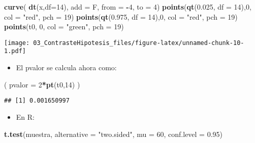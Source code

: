\documentclass[]{article}
\newenvironment{Shaded}{\begin{snugshade}}{\end{snugshade}}
\newcommand{\KeywordTok}[1]{\textcolor[rgb]{0.13,0.29,0.53}{\textbf{#1}}}
\newcommand{\DataTypeTok}[1]{\textcolor[rgb]{0.13,0.29,0.53}{#1}}
\newcommand{\DecValTok}[1]{\textcolor[rgb]{0.00,0.00,0.81}{#1}}
\newcommand{\FloatTok}[1]{\textcolor[rgb]{0.00,0.00,0.81}{#1}}
\newcommand{\StringTok}[1]{\textcolor[rgb]{0.31,0.60,0.02}{#1}}
\newcommand{\OperatorTok}[1]{\textcolor[rgb]{0.81,0.36,0.00}{\textbf{#1}}}
\newcommand{\NormalTok}[1]{#1}
\providecommand{\tightlist}{%
  \setlength{\itemsep}{0pt}\setlength{\parskip}{0pt}}
\begin{document}
\begin{Shaded}
\begin{Highlighting}[]
\KeywordTok{curve}\NormalTok{( }\KeywordTok{dt}\NormalTok{(x,}\DataTypeTok{df=}\DecValTok{14}\NormalTok{), }\DataTypeTok{add =}\NormalTok{ F, }\DataTypeTok{from =} \OperatorTok{-}\DecValTok{4}\NormalTok{, }\DataTypeTok{to =} \DecValTok{4}\NormalTok{)}
\KeywordTok{points}\NormalTok{(}\KeywordTok{qt}\NormalTok{(}\FloatTok{0.025}\NormalTok{, }\DataTypeTok{df =} \DecValTok{14}\NormalTok{),}\DecValTok{0}\NormalTok{, }\DataTypeTok{col =} \StringTok{"red"}\NormalTok{, }\DataTypeTok{pch =} \DecValTok{19}\NormalTok{)}
\KeywordTok{points}\NormalTok{(}\KeywordTok{qt}\NormalTok{(}\FloatTok{0.975}\NormalTok{, }\DataTypeTok{df =} \DecValTok{14}\NormalTok{),}\DecValTok{0}\NormalTok{, }\DataTypeTok{col =} \StringTok{"red"}\NormalTok{, }\DataTypeTok{pch =} \DecValTok{19}\NormalTok{)}
\KeywordTok{points}\NormalTok{(t0, }\DecValTok{0}\NormalTok{, }\DataTypeTok{col =} \StringTok{"green"}\NormalTok{, }\DataTypeTok{pch =} \DecValTok{19}\NormalTok{)}
\end{Highlighting}
\end{Shaded}

\texttt{[image: 03\_ContrasteHipotesis\_files/figure-latex/unnamed-chunk-10-1.pdf]}

\begin{itemize}
\tightlist
\item
  El pvalor se calcula ahora como:
\end{itemize}

\begin{Shaded}
\begin{Highlighting}[]
\NormalTok{( }\DataTypeTok{pvalor =} \DecValTok{2}\OperatorTok{*}\KeywordTok{pt}\NormalTok{(t0,}\DecValTok{14}\NormalTok{) )}
\end{Highlighting}
\end{Shaded}

\begin{verbatim}
## [1] 0.001650997
\end{verbatim}

\begin{itemize}
\tightlist
\item
  En R:
\end{itemize}

\begin{Shaded}
\begin{Highlighting}[]
\KeywordTok{t.test}\NormalTok{(muestra, }\DataTypeTok{alternative =} \StringTok{"two.sided"}\NormalTok{, }\DataTypeTok{mu =} \DecValTok{60}\NormalTok{, }\DataTypeTok{conf.level =} \FloatTok{0.95}\NormalTok{)}
\end{Highlighting}
\end{Shaded}
\end{document}

